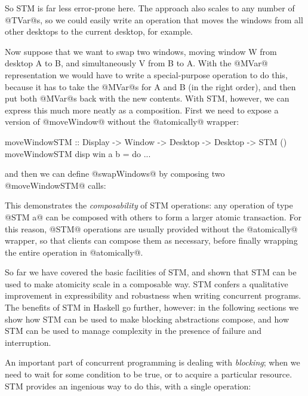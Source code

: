 \noindent So STM is far less error-prone here.  The approach also
scales to any number of @TVar@s, so we could easily write an operation
that moves the windows from all other desktops to the current desktop,
for example.

Now suppose that we want to swap two windows, moving window W from
desktop A to B, and simultaneously V from B to A.  With the @MVar@
representation we would have to write a special-purpose operation to
do this, because it has to take the @MVar@s for A and B (in the right
order), and then put both @MVar@s back with the new contents.  With
STM, however, we can express this much more neatly as a composition.
First we need to expose a version of @moveWindow@ without the
@atomically@ wrapper:

\begin{haskell}
moveWindowSTM :: Display -> Window -> Desktop -> Desktop
              -> STM ()
moveWindowSTM disp win a b = do ...
\end{haskell}

\noindent and then we can define @swapWindows@ by composing two
@moveWindowSTM@ calls:


\noindent This demonstrates the \emph{composability} of STM
operations: any operation of type @STM a@ can be composed with others
to form a larger atomic transaction.  For this reason, @STM@
operations are usually provided without the @atomically@ wrapper, so
that clients can compose them as necessary, before finally wrapping
the entire operation in @atomically@.

So far we have covered the basic facilities of STM, and shown that STM
can be used to make atomicity scale in a composable way.  STM confers
a qualitative improvement in expressibility and robustness when
writing concurrent programs.  The benefits of STM in Haskell go
further, however: in the following sections we show how STM can be
used to make blocking abstractions compose, and how STM can be used to
manage complexity in the presence of failure and interruption.


An important part of concurrent programming is dealing with
\emph{blocking}; when we need to wait for some condition to be true,
or to acquire a particular resource.  STM provides an ingenious way to
do this, with a single operation:

